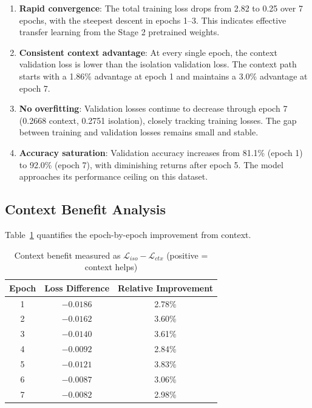 \documentclass[11pt, a4paper]{article}
\begin{document}
\begin{enumerate}
    \item \textbf{Rapid convergence}: The total training loss drops from 2.82 to 0.25 over 7 epochs, with the steepest descent in epochs 1--3. This indicates effective transfer learning from the Stage 2 pretrained weights.

    \item \textbf{Consistent context advantage}: At every single epoch, the context validation loss is lower than the isolation validation loss. The context path starts with a 1.86\% advantage at epoch 1 and maintains a 3.0\% advantage at epoch 7.

    \item \textbf{No overfitting}: Validation losses continue to decrease through epoch 7 (0.2668 context, 0.2751 isolation), closely tracking training losses. The gap between training and validation losses remains small and stable.

    \item \textbf{Accuracy saturation}: Validation accuracy increases from 81.1\% (epoch 1) to 92.0\% (epoch 7), with diminishing returns after epoch 5. The model approaches its performance ceiling on this dataset.
\end{enumerate}

\subsection{Context Benefit Analysis}

Table~\ref{tab:context_benefit} quantifies the epoch-by-epoch improvement from context.

\begin{table}[h]
\centering
\caption{Context benefit measured as $\mathcal{L}_{iso} - \mathcal{L}_{ctx}$ (positive = context helps)}
\label{tab:context_benefit}
\begin{tabular}{ccc}
\toprule
\textbf{Epoch} & \textbf{Loss Difference} & \textbf{Relative Improvement} \\
\midrule
1 & $-0.0186$ & 2.78\% \\
2 & $-0.0162$ & 3.60\% \\
3 & $-0.0140$ & 3.61\% \\
4 & $-0.0092$ & 2.84\% \\
5 & $-0.0121$ & 3.83\% \\
6 & $-0.0087$ & 3.06\% \\
7 & $-0.0082$ & 2.98\% \\
\bottomrule
\end{tabular}
\end{table}
\end{document}
